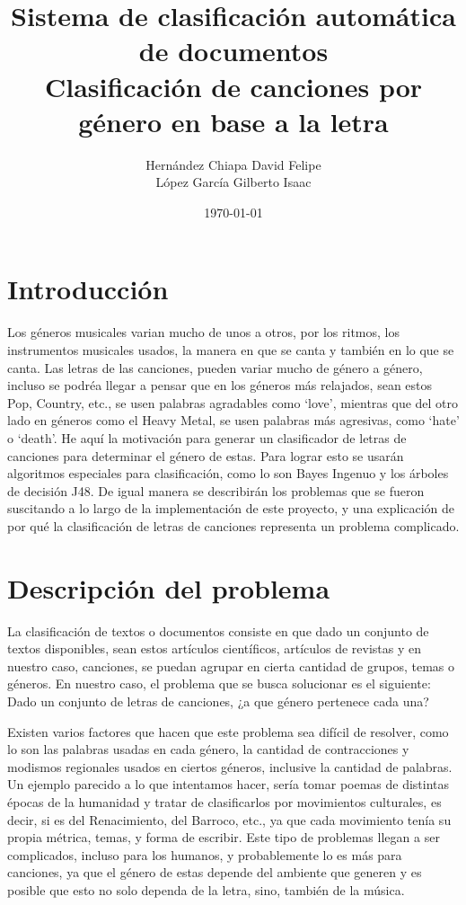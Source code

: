 \documentclass[spanish,11pt,letterpaper]{article}
\title{Sistema de clasificación automática de documentos\\
Clasificación de canciones por género en base a la letra}
\author{Hernández Chiapa David Felipe\\
López García Gilberto Isaac}
\affil{Facultad de Ciencias\\{\small Universidad Nacional Autónoma de México}}
\date{\small\today}
\begin{document}
\maketitle

\section{Introducción}

Los géneros musicales varian mucho de unos a otros, por los ritmos, los instrumentos musicales
usados, la manera en que se canta y también en lo que se canta. Las letras de las canciones, pueden
variar mucho de género a género, incluso se podréa llegar a pensar que en los géneros más
relajados, sean estos Pop, Country, etc., se usen palabras agradables como ‘love’, mientras que del
otro lado en géneros como el Heavy Metal, se usen palabras más agresivas, como ‘hate’ o ‘death’.
He aquí la motivación para generar un clasificador de letras de canciones para determinar el género de
estas. Para lograr esto se usarán algoritmos especiales para clasificación, como lo son Bayes
Ingenuo y los árboles de decisión J48. De igual manera se describirán los problemas que se
fueron suscitando a lo largo de la implementación de este proyecto, y una explicación de por qué
la clasificación de letras de canciones representa un problema complicado.

\section{Descripción del problema}

La clasificación de textos o documentos consiste en que dado un conjunto de textos disponibles,
sean estos artículos científicos, artículos de revistas y en nuestro caso, canciones, se puedan
agrupar en cierta cantidad de grupos, temas o géneros. En nuestro caso, el problema que se busca
solucionar es el siguiente: Dado un conjunto de letras de canciones, ¿a que género pertenece cada
una?

Existen varios factores que hacen que este problema sea difícil de resolver, como lo son las
palabras usadas en cada género, la cantidad de contracciones y modismos regionales usados en ciertos géneros,
inclusive la cantidad de palabras. Un ejemplo parecido a lo que intentamos hacer, sería tomar
poemas de distintas épocas de la humanidad y tratar de clasificarlos por movimientos culturales, es
decir, si es del Renacimiento, del Barroco, etc., ya que cada movimiento tenía su propia métrica,
temas, y forma de escribir. Este tipo de problemas llegan a ser complicados, incluso para los
humanos, y probablemente lo es más para canciones, ya que el género de estas depende del ambiente
que generen y es posible que esto no solo dependa de la letra, sino, también de la música.
\end{document}
